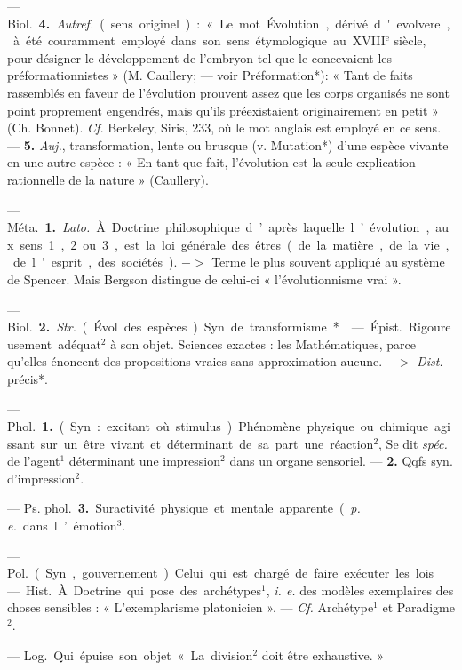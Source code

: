 \begin{itemize}[leftmargin=1cm, label=, itemsep=1pt]
— \si{Biol.} {\bf 4.} {\it Autref.} (sens originel) :
« Le mot Évolution, dérivé d'evolvere, à été couramment employé
dans son sens étymologique au
{\footnotesize XVIII}$^\text{e}$ siècle, pour désigner le développement de l'embryon tel que le
concevaient les préformationnistes »
(M. Caullery; — voir Préformation*):
« Tant de faits rassemblés en faveur
de l’évolution prouvent assez que
les corps organisés ne sont point
proprement engendrés, mais qu'ils
préexistaient originairement en
petit » (Ch. Bonnet). {\it Cf.} Berkeley,
Siris, 233, où le mot anglais est
employé en ce sens. — {\bf 5.} {\it Auj.}, transformation, lente ou brusque (v. Mutation*) d’une espèce vivante en une
autre espèce : « En tant que fait,
l’évolution est la seule explication
rationnelle de la nature » (Caullery).

— \si{Méta.} {\bf 1.} {\it Lato.} À Doctrine philosophique d’après laquelle l’évolution, aux sens 1, 2 ou 3, est la loi
générale des êtres (de la matière,
de la vie, de l'esprit, des sociétés).
$->$ Terme le plus souvent appliqué
au système de Spencer. Mais Bergson
distingue de celui-ci « l’évolutionnisme vrai ».

— \si{Biol.} {\bf 2.} {\it Str.} (Évol. des espèces)
Syn. de transformisme*.

 — \si{Épist.} Rigoureusement adéquat$^2$ à son objet. Sciences exactes :
les Mathématiques, parce qu'elles
énoncent des propositions vraies sans
approximation aucune. $->$ {\it Dist.}
précis*.

 — \si{Phol.} {\bf 1.} (Syn. : excitant où stimulus). Phénomène physique ou chimique agissant sur un
être vivant et déterminant de sa part
une réaction$^2$, Se dit {\it spéc.} de l’agent$^1$
déterminant une impression$^2$ dans
un organe sensoriel. — {\bf 2.} Qqfs
syn. d’impression$^2$.

— \si{Ps. phol.} {\bf 3.} Suractivité physique et mentale apparente ({\it p. e.} dans
l’émotion$^3$.

 — \si{Pol.} (Syn,
gouvernement). Celui qui est chargé
de faire exécuter les lois.

 — \si{Hist.} À. Doctrine
qui pose des archétypes$^1$, {\it i. e.} des
modèles exemplaires des choses sensibles : « L’exemplarisme platonicien ». — {\it Cf.} Archétype$^1$ et Paradigme$^2$.

 — \si{Log.} Qui épuise son
objet « La division$^2$ doit être
exhaustive. »


\end{itemize}
